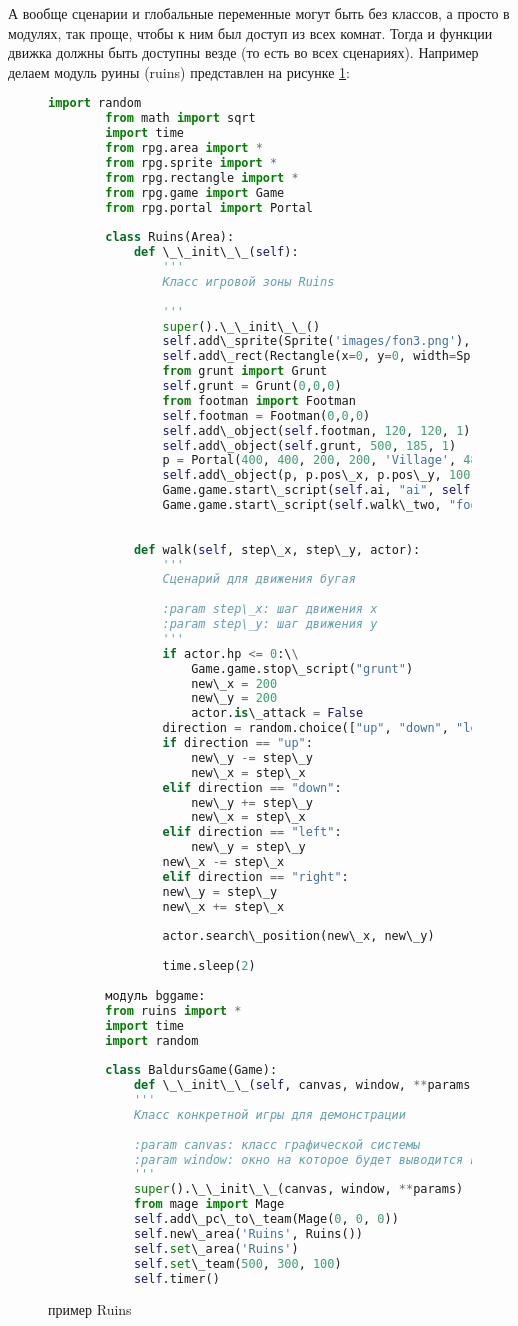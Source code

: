 А вообще сценарии и глобальные переменные могут быть без классов, а просто в модулях, так проще, чтобы к ним был доступ из всех комнат. Тогда и функции движка должны быть доступны везде (то есть во всех сценариях). Например делаем модуль руины (ruins) представлен на рисунке \ref{ruins:image}:
\begin{figure}[H]
	\begin{lstlisting}[language=Python]
		import random
		from math import sqrt
		import time
		from rpg.area import *
		from rpg.sprite import *
		from rpg.rectangle import *
		from rpg.game import Game
		from rpg.portal import Portal
		
		class Ruins(Area):
			def \_\_init\_\_(self):
				'''
				Класс игровой зоны Ruins
			
				'''
				super().\_\_init\_\_()
				self.add\_sprite(Sprite('images/fon3.png'), 590, 400, 0)
				self.add\_rect(Rectangle(x=0, y=0, width=Sprite('images/fon3.png').image.width(), height=Sprite('images/fon3.png').image.height()))
				from grunt import Grunt
				self.grunt = Grunt(0,0,0)
				from footman import Footman
				self.footman = Footman(0,0,0)
				self.add\_object(self.footman, 120, 120, 1)
				self.add\_object(self.grunt, 500, 185, 1)
				p = Portal(400, 400, 200, 200, 'Village', 480, 100)
				self.add\_object(p, p.pos\_x, p.pos\_y, 100)
				Game.game.start\_script(self.ai, "ai", self.grunt)
				Game.game.start\_script(self.walk\_two, "footman", 50, 50)
		
		
			def walk(self, step\_x, step\_y, actor):
				'''
				Сценарий для движения бугая
		
				:param step\_x: шаг движения x
				:param step\_y: шаг движения y
				'''
				if actor.hp <= 0:\\
					Game.game.stop\_script("grunt")
					new\_x = 200
					new\_y = 200
					actor.is\_attack = False
				direction = random.choice(["up", "down", "left", "right"])
				if direction == "up":
					new\_y -= step\_y
					new\_x = step\_x
				elif direction == "down":
					new\_y += step\_y
					new\_x = step\_x
				elif direction == "left":
					new\_y = step\_y
				new\_x -= step\_x
				elif direction == "right":
				new\_y = step\_y
				new\_x += step\_x
		
				actor.search\_position(new\_x, new\_y)
		
				time.sleep(2)
		
		модуль bggame:
		from ruins import *
		import time
		import random
		
		class BaldursGame(Game):
			def \_\_init\_\_(self, canvas, window, **params):
			'''
			Класс конкретной игры для демонстрации
		
			:param canvas: класс графической системы
			:param window: окно на которое будет выводится игра
			'''
			super().\_\_init\_\_(canvas, window, **params)
			from mage import Mage
			self.add\_pc\_to\_team(Mage(0, 0, 0))
			self.new\_area('Ruins', Ruins())
			self.set\_area('Ruins')
			self.set\_team(500, 300, 100)
			self.timer()
	\end{lstlisting}  
	\caption{пример Ruins}
	\label{ruins:image}
\end{figure}


